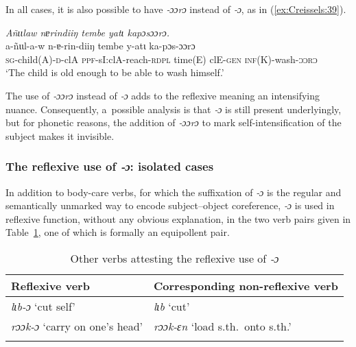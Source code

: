 \documentclass[output=paper]{langscibook}
\begin{document}
In all cases, it is also possible to have \textit{‑ɔɔrɔ} instead of \textit{‑ɔ}, as in (\ref{ex:Creissels:39}).

\ea
  \label{ex:Creissels:39}

    \textit{Añɩɩlaw nɐrindiiŋ tembe yatɩ kapɔsɔɔrɔ.}\\
    \gll a-ñɩɩl-a-w n-ɐ-rin-diiŋ tembe y-atɩ ka-pɔs-ɔɔrɔ\\
    \textsc{sg}-child(A)-\textsc{d}-clA \textsc{ppf}-sI:clA-reach-\textsc{rdpl} time(E)
    clE-\textsc{gen} \textsc{inf}(K)-wash-\textsc{ɔɔrɔ}\\
    \glt `The child is old enough to be able to wash himself.'

\z

The use of \textit{‑ɔɔrɔ} instead of \textit{‑ɔ} adds to the reflexive meaning an
intensifying nuance.  Consequently, a~possible analysis is that \textit{‑ɔ} is
still present underlyingly, but for phonetic reasons, the addition of
\textit{‑ɔɔrɔ} to mark self-intensification of the subject makes it invisible.

\subsubsection{The reflexive use of \textit{‑ɔ}: isolated cases}%
\label{sec:Creissels:isolated-o}

In addition to body-care verbs, for which the suffixation of \textit{‑ɔ} is the
regular and semantically unmarked way to encode subject--object coreference,
\textit{‑ɔ} is used in reflexive function, without any obvious explanation, in
the two verb pairs given in Table~\ref{tab:Creissels:o-more-verbs}, one of which is
formally an equipollent pair.

\begin{table}[ht]
  \centering
  \begin{tabular}{ll}
    \lsptoprule
    Reflexive verb & Corresponding non-reflexive verb \\
                           
    \hline
    \textit{lɩb-ɔ} `cut self' & \textit{lɩb} `cut' \\
    \textit{rɔɔk-ɔ} `carry on one's head' & \textit{rɔɔk-ɛn} `load s.th.\ onto s.th.' \\
    \lspbottomrule
  \end{tabular}
  \caption{Other verbs attesting the reflexive use of \textit{‑ɔ}}%
  \label{tab:Creissels:o-more-verbs}
\end{table}
\end{document}
